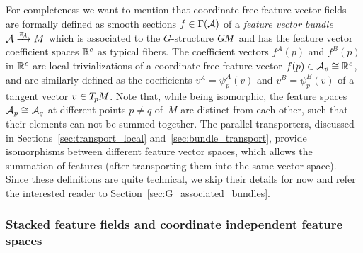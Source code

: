 For completeness we want to mention that coordinate free feature vector fields are formally defined as smooth sections $f\in\Gamma(\mathcal{A})$ of a \emph{feature vector bundle} $\A\piAarrow M$ which is associated to the $G$-structure $G\mkern-1.4muM$ and has the feature vector coefficient spaces $\mathbb{R}^c$ as typical fibers.
The coefficient vectors $f^A(p)$ and $f^B(p)$ in $\mathbb{R}^c$ are local trivializations of a coordinate free feature vector $f(p) \in \mathcal{A}_p \cong \mathbb{R}^c$, and are similarly defined as the coefficients $v^A=\psi_p^A(v)$ and $v^B=\psi_p^B(v)$ of a tangent vector $v\in T_{\mkern-1.5mu p}\mkern-.5muM$.
Note that, while being isomorphic, the feature spaces $\mathcal{A}_p \cong \mathcal{A}_q$ at different points $p\neq q$ of~$M$ are distinct from each other, such that their elements can not be summed together.
The parallel transporters, discussed in Sections~\ref{sec:transport_local} and~\ref{sec:bundle_transport}, provide isomorphisms between different feature vector spaces, which allows the summation of features (after transporting them into the same vector space).
Since these definitions are quite technical, we skip their details for now and refer the interested reader to Section~\ref{sec:G_associated_bundles}.








\subsubsection{Stacked feature fields and coordinate independent feature spaces}
\label{sec:stacked_fields}

